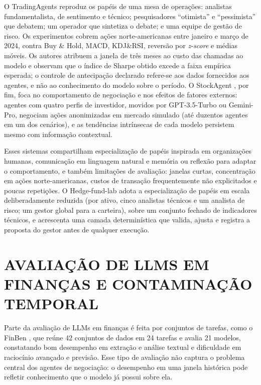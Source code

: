 O TradingAgents \citep{TradingAgents2024} reproduz os papéis de uma mesa de operações: analistas fundamentalista, de sentimento e técnico; pesquisadores ``otimista'' e ``pessimista'' que debatem; um operador que sintetiza o debate; e uma equipe de gestão de risco. Os experimentos cobrem ações norte-americanas entre janeiro e março de 2024, contra Buy \& Hold, MACD, KDJ\&RSI, reversão por \textit{z-score} e médias móveis. Os autores atribuem a janela de três meses ao custo das chamadas ao modelo e observam que o índice de Sharpe obtido excede a faixa empírica esperada; o controle de antecipação declarado refere-se aos dados fornecidos aos agentes, e não ao conhecimento do modelo sobre o período. O StockAgent \citep{StockAgent2024}, por fim, foca no comportamento de negociação e nos efeitos de fatores externos: agentes com quatro perfis de investidor, movidos por GPT-3.5-Turbo ou Gemini-Pro, negociam ações anonimizadas em mercado simulado (até duzentos agentes em um dos cenários), e as tendências intrínsecas de cada modelo persistem mesmo com informação contextual.

Esses sistemas compartilham especialização de papéis inspirada em organizações humanas, comunicação em linguagem natural e memória ou reflexão para adaptar o comportamento, e também limitações de avaliação: janelas curtas, concentração em ações norte-americanas, custos de transação frequentemente não explicitados e poucas repetições. O Hedge-fund-lab adota a especialização de papéis em escala deliberadamente reduzida (por ativo, cinco analistas técnicos e um analista de risco; um gestor global para a carteira), sobre um conjunto fechado de indicadores técnicos, e acrescenta uma camada determinística que valida, ajusta e registra a proposta do gestor antes de qualquer execução.

\section{AVALIAÇÃO DE LLMS EM FINANÇAS E CONTAMINAÇÃO TEMPORAL}
\label{sec:rel-avaliacao}

Parte da avaliação de LLMs em finanças é feita por conjuntos de tarefas, como o FinBen \citep{FinBen2024}, que reúne 42 conjuntos de dados em 24 tarefas e avalia 21 modelos, constatando bom desempenho em extração e análise textual e dificuldade em raciocínio avançado e previsão. Esse tipo de avaliação não captura o problema central dos agentes de negociação: o desempenho em uma janela histórica pode refletir conhecimento que o modelo já possui sobre ela.

